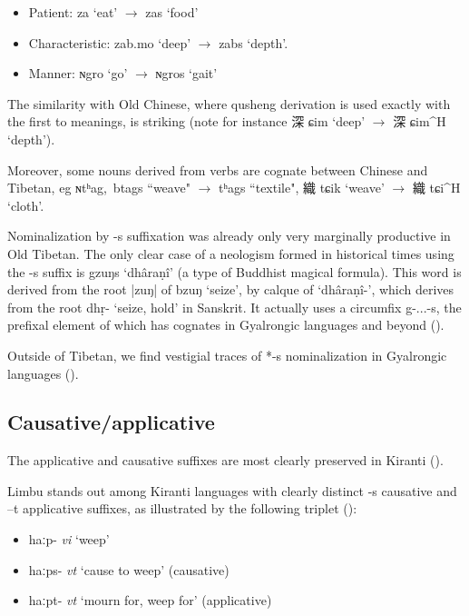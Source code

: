 \documentclass[oldfontcommands,oneside,a4paper,11pt]{article}
\newcommand{\ipa}[1]{{\phon \mbox{#1}}} %
\newcommand{\zh}[1]{{\cn #1}}
\newcommand{\ch}[3]{\zh{#1} \ipa{#2} `#3'}
\begin{document}
\begin{itemize}
\item Patient: \ipa{za} `eat' $\rightarrow$ \ipa{zas} `food' 
\item Characteristic: \ipa{zab.mo} `deep'  $\rightarrow$ \ipa{zabs} `depth'.
\item Manner: \ipa{ɴgro} `go'  $\rightarrow$ \ipa{ɴgros} `gait' 
 \end{itemize}

The similarity with Old Chinese, where qusheng derivation is used exactly with the first to meanings, is striking (note for instance \ch{深}{ɕim}{deep} $\rightarrow$ \ch{深}{ɕim^H}{depth}).

Moreover, some nouns derived from verbs are cognate between Chinese and Tibetan, eg \ipa{ɴtʰag, btags} ``weave" $\rightarrow$ \ipa{tʰags} ``textile", \ch{織}{tɕik}{weave} $\rightarrow$ \ch{織}{tɕi^H}{cloth}.

Nominalization by \ipa{-s} suffixation was already only very marginally productive in Old Tibetan. The only clear case of a neologism formed in historical times using the \ipa{-s} suffix is \ipa{gzuŋs} `dhâraṇî' (a type of Buddhist magical formula). This word is derived from the root \ipa{|zuŋ|} of \ipa{bzuŋ} `seize', by calque of `dhâraṇî-', which derives from the root dhṛ- `seize, hold' in Sanskrit. It actually uses a circumfix \ipa{g-...-s}, the prefixal element of which has cognates in Gyalrongic languages and beyond (\citealt{jacques14snom}).

Outside of Tibetan, we find vestigial traces of *\ipa{-s} nominalization in Gyalrongic languages (\citealt{jacques03s.houzhui}).

 \subsection{Causative/applicative} \label{sec:causative}
The applicative and causative suffixes are most clearly preserved in Kiranti (\citealt{michailovsky85dental, jacques15derivational.khaling}).

Limbu stands out among Kiranti languages with clearly distinct \ipa{-s} causative and \ipa{--t} applicative suffixes, as illustrated by the following triplet (\citealt{michailovsky02dico}):
\begin{itemize}
\item \ipa{haːp-} \textit{vi} `weep'
\item \ipa{haːps-} \textit{vt} `cause to weep' (causative)
\item \ipa{haːpt-} \textit{vt} `mourn for, weep for' (applicative)
\end{itemize}
\end{document}
